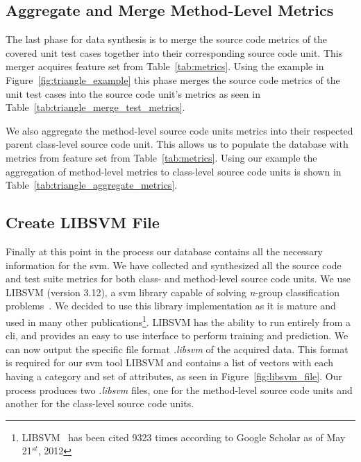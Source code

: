 \subsection{Aggregate and Merge Method-Level Metrics}
\label{subsec:approach_aggregate_merge_metrics}
The last phase for data synthesis is to merge the source code metrics of the covered unit test cases together into their corresponding source code unit. This merger acquires feature set  from Table~\ref{tab:metrics}. Using the example in Figure~\ref{fig:triangle_example} this phase merges the source code metrics of the unit test cases into the source code unit's metrics as seen in Table~\ref{tab:triangle_merge_test_metrics}.

We also aggregate the method-level source code units metrics into their respected parent class-level source code unit. This allows us to populate the database with metrics from feature set  from Table~\ref{tab:metrics}. Using our example the aggregation of method-level metrics to class-level source code units is shown in Table~\ref{tab:triangle_aggregate_metrics}.


\subsection{Create LIBSVM File}
\label{subsec:approach_create_libsvm_file}
Finally at this point in the process our database contains all the necessary information for the \gls{svm}. We have collected and synthesized all the source code and test suite metrics for both class- and method-level source code units. We use LIBSVM (version 3.12), a \gls{svm} library capable of solving \emph{n}-group classification problems~\cite{CL11}. We decided to use this library implementation as it is mature and used in many other publications\footnote{LIBSVM~\cite{CL11} has been cited 9323 times according to Google Scholar as of May 21$^{st}$, 2012}. LIBSVM has the ability to run entirely from a \gls{cli}, and provides an easy to use interface to perform training and prediction. We can now output the specific file format \emph{.libsvm} of the acquired data. This format is required for our \gls{svm} tool LIBSVM and contains a list of vectors with each having a category and set of attributes, as seen in Figure~\ref{fig:libsvm_file}. Our process produces two \emph{.libsvm} files, one for the method-level source code units and another for the class-level source code units.


